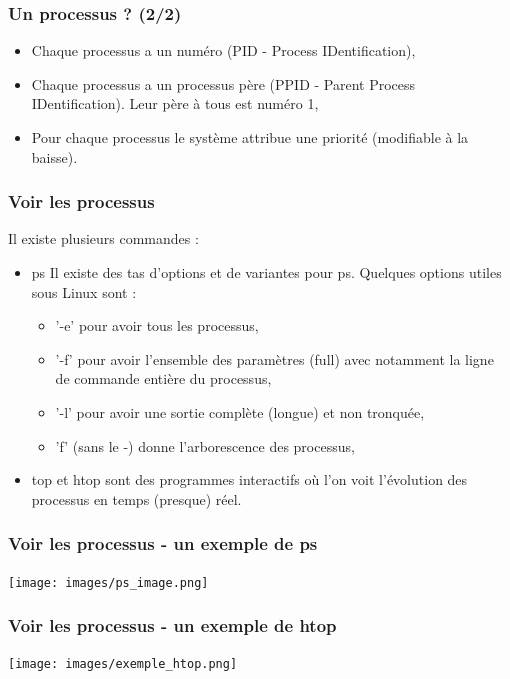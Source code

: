 \documentclass[handout,10pt]{beamer}
\begin{document}
\frame
{
    \frametitle{Un processus ? (2/2)}

    \begin{itemize}
        \item Chaque processus a un numéro (PID - Process IDentification),
        \item Chaque processus a un processus père (PPID - Parent Process IDentification). Leur père à tous est numéro 1,
        \item Pour chaque processus le système attribue une priorité (modifiable à la baisse).
    \end{itemize}
}


\frame
{
    \frametitle{Voir les processus}

    Il existe plusieurs commandes :

    \begin{itemize}
        \item {\ttfamily ps} Il existe des tas d'options et de variantes pour {\ttfamily ps}. Quelques options utiles sous Linux sont :
            \begin{itemize}
                \item '-e' pour avoir tous les processus,
                \item '-f' pour avoir l'ensemble des paramètres (full) avec notamment la ligne de commande entière du processus,
                \item '-l' pour avoir une sortie complète (longue) et non tronquée,
                \item 'f'  (sans le -) donne l'arborescence des processus,
            \end{itemize}
        \item {\ttfamily top} et {\ttfamily htop} sont des programmes interactifs où l'on voit l'évolution des processus en temps (presque) réel.
    \end{itemize}
}


\frame
{
    \frametitle{Voir les processus - un exemple de ps}

    \texttt{[image: images/ps\_image.png]}
}


\frame
{
    \frametitle{Voir les processus - un exemple de htop}

    \texttt{[image: images/exemple\_htop.png]}
}
\end{document}
